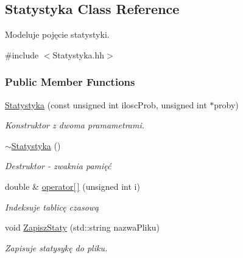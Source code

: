 \hypertarget{class_statystyka}{\subsection{Statystyka Class Reference}
\label{class_statystyka}
}


Modeluje pojęcie statystyki.  




{\ttfamily \#include $<$Statystyka.\-hh$>$}

\subsubsection*{Public Member Functions}
\begin{DoxyCompactItemize}
\item 
\hyperlink{class_statystyka_a93d6a8763a84859ac52ec222b5ce31a6}{Statystyka} (const unsigned int ilosc\-Prob, unsigned int $\ast$proby)
\begin{DoxyCompactList}\small\item\em Konstruktor z dwoma pramametrami. \end{DoxyCompactList}\item 
\hyperlink{class_statystyka_ab9e4be151572e6851af96c08812a602a}{$\sim$\-Statystyka} ()
\begin{DoxyCompactList}\small\item\em Destruktor -\/ zwaknia pamięć \end{DoxyCompactList}\item 
double \& \hyperlink{class_statystyka_a651fc79171891fdb793836c2d1ac4669}{operator\mbox{[}$\,$\mbox{]}} (unsigned int i)
\begin{DoxyCompactList}\small\item\em Indeksuje tablicę czasową \end{DoxyCompactList}\item 
void \hyperlink{class_statystyka_a922a015761e06edcb9ff966cd0af16ab}{Zapisz\-Staty} (std\-::string nazwa\-Pliku)
\begin{DoxyCompactList}\small\item\em Zapisuje statysykę do pliku. \end{DoxyCompactList}\end{DoxyCompactItemize}
